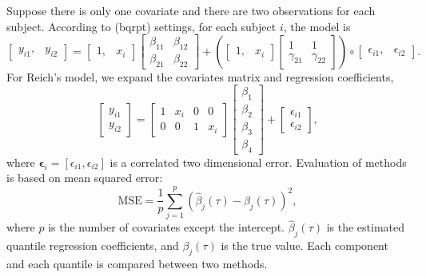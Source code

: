 \documentclass{article}
\begin{document}
Suppose there is only one covariate and there are two observations for
each subject. According to (bqrpt) settings, for each subject $i$, the
model is 
\begin{displaymath}
\begin{bmatrix}
y_{i1}, & y_{i2}
\end{bmatrix}
= 
\begin{bmatrix}
1, & x_i
\end{bmatrix}
\begin{bmatrix}
\beta_{11} & \beta_{12} \\
\beta_{21} & \beta_{22}
\end{bmatrix}
+ \left( 
\begin{bmatrix}
1, & x_i
\end{bmatrix}
\begin{bmatrix}
  1 & 1\\
  \gamma_{21} & \gamma_{22}
\end{bmatrix}
 \right)
\circ
\begin{bmatrix}
\epsilon_{i1}, & \epsilon_{i2}
\end{bmatrix}.
\end{displaymath}
For Reich's model, we expand the covariates matrix and regression
coefficients,
\begin{displaymath}
\begin{bmatrix}
y_{i1}\\
y_{i2}
\end{bmatrix}
= 
\begin{bmatrix}
  1 & x_i & 0 & 0\\
  0 & 0 & 1 & x_i
\end{bmatrix}
\begin{bmatrix}
\beta_1\\
\beta_2\\
\beta_3\\
\beta_4
\end{bmatrix}
+ 
\begin{bmatrix}
\epsilon_{i1}\\
\epsilon_{i2}
\end{bmatrix},
\end{displaymath}
where $\bm{\epsilon}_i = [\epsilon_{i1}, \epsilon_{i2}]$ is a
correlated two dimensional error. Evaluation of methods is based on
mean squared error:
\begin{displaymath}
\text{MSE} = \frac{1}{p} \sum_{j=1}^p \left( \hat{\beta}_j(\tau) -
  \beta_j(\tau) \right)^2, 
\end{displaymath}
where $p$ is the number of covariates except the
intercept. $\hat{\beta}_j(\tau)$ is the estimated quantile regression
coefficients, and $\beta_j(\tau)$ is the true value. Each component
and each quantile is compared between two methods. 
\end{document}
